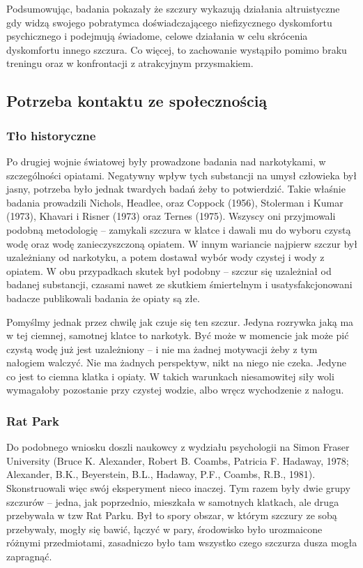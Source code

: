 \documentclass[12pt]{article}
\begin{document}
Podsumowując, badania pokazały że szczury wykazują działania altruistyczne gdy widzą swojego pobratymca doświadczającego niefizycznego dyskomfortu psychicznego i podejmują świadome, celowe działania w celu skrócenia dyskomfortu innego szczura. Co więcej, to zachowanie wystąpiło pomimo braku treningu oraz w konfrontacji z atrakcyjnym przysmakiem.

\subsection{Potrzeba kontaktu ze społecznością}

\subsubsection{Tło historyczne}

Po drugiej wojnie światowej były prowadzone badania nad narkotykami, w szczególności opiatami. Negatywny wpływ tych substancji na umysł człowieka był jasny, potrzeba było jednak twardych badań żeby to potwierdzić. Takie właśnie badania prowadzili Nichols, Headlee, oraz Coppock (1956), Stolerman i Kumar (1973), Khavari i Risner (1973) oraz Ternes (1975). Wszyscy oni przyjmowali podobną metodologię -- zamykali szczura w klatce i dawali mu do wyboru czystą wodę oraz wodę zanieczyszczoną opiatem. W innym wariancie najpierw szczur był uzależniany od narkotyku, a potem dostawał wybór wody czystej i wody z opiatem. W obu przypadkach skutek był podobny -- szczur się uzależniał od badanej substancji, czasami nawet ze skutkiem śmiertelnym i usatysfakcjonowani badacze publikowali badania że opiaty są złe.

Pomyślmy jednak przez chwilę jak czuje się ten szczur. Jedyna rozrywka jaką ma w tej ciemnej, samotnej klatce to narkotyk. Być może w momencie jak może pić czystą wodę już jest uzależniony -- i nie ma żadnej motywacji żeby z tym nałogiem walczyć. Nie ma żadnych perspektyw, nikt na niego nie czeka. Jedyne co jest to ciemna klatka i opiaty. W takich warunkach niesamowitej siły woli wymagałoby pozostanie przy czystej wodzie, albo wręcz wychodzenie z nałogu.

\subsubsection{Rat Park}

Do podobnego wniosku doszli naukowcy z wydziału psychologii na Simon Fraser University (Bruce K. Alexander, Robert B. Coambs, Patricia F. Hadaway, 1978; Alexander, B.K., Beyerstein, B.L., Hadaway, P.F., Coambs, R.B., 1981). Skonstruowali więc swój eksperyment nieco inaczej. Tym razem były dwie grupy szczurów -- jedna, jak poprzednio, mieszkała w samotnych klatkach, ale druga przebywała w tzw Rat Parku. Był to spory obszar, w którym szczury ze sobą przebywały, mogły się bawić, łączyć w pary, środowisko było urozmaicone różnymi przedmiotami, zasadniczo było tam wszystko czego szczurza dusza mogła zapragnąć.
\end{document}
